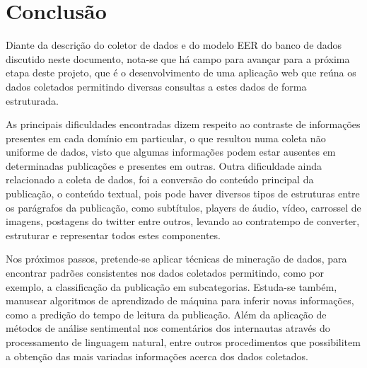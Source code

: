 
\section{Conclusão}
Diante da descrição do coletor de dados e do modelo EER do banco de dados discutido neste documento, nota-se que há campo para avançar para a próxima etapa deste projeto, que é o desenvolvimento de uma aplicação web que reúna os dados coletados permitindo diversas consultas a estes dados de forma estruturada.

As principais dificuldades encontradas dizem respeito ao contraste de informações presentes em cada domínio em particular, o que resultou numa coleta não uniforme de dados, visto que algumas informações podem estar ausentes em determinadas publicações e presentes em outras. Outra dificuldade ainda relacionado a coleta de dados, foi a conversão do conteúdo principal da publicação, o conteúdo textual, pois pode haver diversos tipos de estruturas entre os parágrafos da publicação, como subtítulos, players de áudio, vídeo, carrossel de imagens, postagens do twitter entre outros, levando ao contratempo de converter, estruturar e representar todos estes componentes.

Nos próximos passos, pretende-se aplicar técnicas de mineração de dados, para encontrar padrões consistentes nos dados coletados permitindo, como por exemplo, a classificação da publicação em subcategorias. Estuda-se também, manusear algoritmos de aprendizado de máquina para inferir novas informações, como a predição do tempo de leitura da publicação. Além da aplicação de métodos de análise sentimental nos comentários dos internautas através do processamento de linguagem natural, entre outros procedimentos que possibilitem a obtenção das mais variadas informações acerca dos dados coletados.
